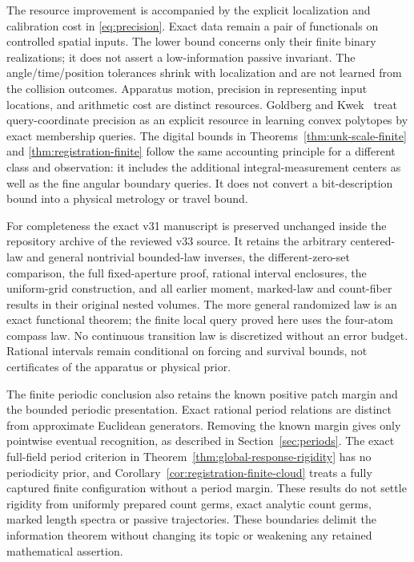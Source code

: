 The resource improvement is accompanied by the explicit localization
and calibration cost in \eqref{eq:precision}. Exact data remain a pair
of functionals on controlled spatial inputs. The lower bound concerns
only their finite binary realizations; it does not assert a low-information
passive invariant. The angle/time/position tolerances shrink with
localization and are not learned from the collision outcomes. Apparatus
motion, precision in representing input locations, and arithmetic
cost are distinct resources. Goldberg and Kwek~\cite{GK} treat
query-coordinate precision as an explicit resource in learning convex
polytopes by exact membership queries. The digital bounds in
Theorems~\ref{thm:unk-scale-finite} and \ref{thm:registration-finite}
follow the same accounting principle
for a different class and observation: it includes the additional
integral-measurement centers as well as the fine angular boundary
queries. It does not convert a bit-description bound into a physical
metrology or travel bound.

For completeness the exact v31 manuscript is preserved unchanged
inside the repository archive of the reviewed v33 source. It retains the arbitrary centered-law and general
nontrivial bounded-law inverses, the different-zero-set comparison,
the full fixed-aperture proof, rational interval enclosures, the
uniform-grid construction, and all earlier moment, marked-law and
count-fiber results in their original nested volumes. The more general
randomized law is an exact functional theorem; the finite local query
proved here uses the four-atom compass law. No continuous transition
law is discretized without an error budget. Rational intervals remain
conditional on forcing and survival bounds, not certificates of the
apparatus or physical prior.

The finite periodic conclusion also retains the known positive patch
margin and the bounded periodic presentation. Exact rational period
relations are distinct from approximate Euclidean generators. Removing
the known margin gives only pointwise eventual recognition, as described
in Section~\ref{sec:periods}. The exact full-field period criterion in
Theorem~\ref{thm:global-response-rigidity} has no periodicity prior,
and Corollary~\ref{cor:registration-finite-cloud} treats a fully
captured finite configuration without a period margin. These results
do not settle rigidity from uniformly prepared count germs, exact analytic count germs, marked
length spectra or passive trajectories. These boundaries delimit the
information theorem without changing its topic or weakening any retained
mathematical assertion.

